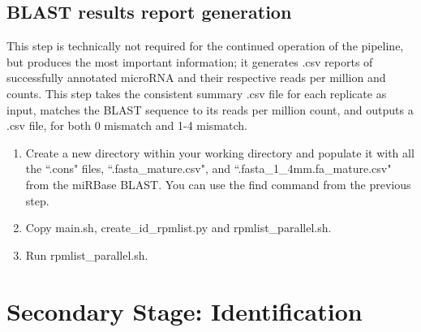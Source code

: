 \documentclass[12pt,titlepage]{article}
\begin{document}
\subsection{BLAST results report generation}
This step is technically not required for the continued operation of the pipeline, but produces the most important information; it generates .csv reports of successfully annotated microRNA and their respective reads per million and counts. This step takes the consistent summary .csv file for each replicate as input, matches the BLAST sequence to its reads per million count, and outputs a .csv file, for both 0 mismatch and 1-4 mismatch.
\begin{enumerate}
\item Create a new directory within your working directory and populate it with all the ``.cons" files, ``.fasta\_mature.csv", and ``.fasta\_1\_4mm.fa\_mature.csv" from the miRBase BLAST. You can use the find command from the previous step.
\item Copy main.sh, create\_id\_rpmlist.py and rpmlist\_parallel.sh.
\item Run rpmlist\_parallel.sh.
\end{enumerate}

\section{Secondary Stage: Identification}
\end{document}
